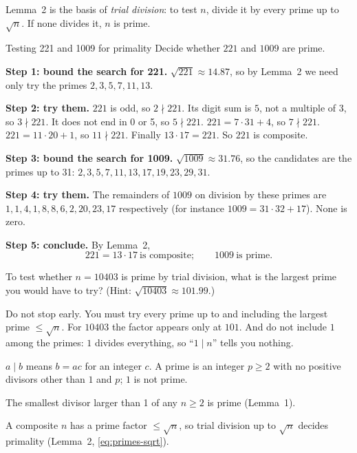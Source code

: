 Lemma~2 is the basis of \emph{trial division}: to test $n$, divide it by every prime up to $\sqrt n$. If none divides it, $n$ is prime.

\begin{sample}{Testing 221 and 1009 for primality}
Decide whether $221$ and $1009$ are prime.

\textbf{Step 1: bound the search for 221.} $\sqrt{221}\approx14.87$, so by Lemma~2 we need only try the primes $2,3,5,7,11,13$.

\textbf{Step 2: try them.} $221$ is odd, so $2\nmid221$. Its digit sum is $5$, not a multiple of 3, so $3\nmid 221$. It does not end in 0 or 5, so $5\nmid221$. $221=7\cdot31+4$, so $7\nmid221$. $221=11\cdot20+1$, so $11\nmid221$. Finally $13\cdot17=221$. So $221$ is composite.

\textbf{Step 3: bound the search for 1009.} $\sqrt{1009}\approx31.76$, so the candidates are the primes up to 31: $2,3,5,7,11,13,17,19,23,29,31$.

\textbf{Step 4: try them.} The remainders of $1009$ on division by these primes are $1,1,4,1,8,8,6,2,20,23,17$ respectively (for instance $1009=31\cdot32+17$). None is zero.

\textbf{Step 5: conclude.} By Lemma~2,
\[
\boxed{221=13\cdot17\ \text{is composite};\qquad 1009\ \text{is prime}.}
\]
\end{sample}

\begin{checkpoint}
To test whether $n=10403$ is prime by trial division, what is the largest prime you would have to try? (Hint: $\sqrt{10403}\approx 101.99$.)
\end{checkpoint}

\begin{pitfall}
Do not stop early. You must try every prime up to and including the largest prime $\le\sqrt n$. For $10403$ the factor appears only at $101$. And do not include $1$ among the primes: $1$ divides everything, so ``$1\mid n$'' tells you nothing.
\end{pitfall}

\begin{keyideas}
\item $a\mid b$ means $b=ac$ for an integer $c$. A prime is an integer $p\ge2$ with no positive divisors other than $1$ and $p$; $1$ is not prime.
\item The smallest divisor larger than 1 of any $n\ge2$ is prime (Lemma~1).
\item A composite $n$ has a prime factor $\le\sqrt n$, so trial division up to $\sqrt n$ decides primality (Lemma~2, \cref{eq:primes-sqrt}).
\end{keyideas}

